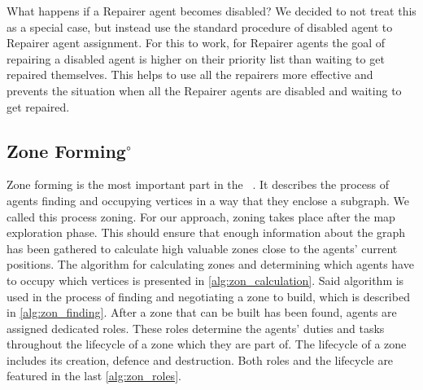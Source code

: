 What happens if a Repairer agent becomes disabled?
We decided to not treat this as a special case, but instead use the standard procedure of disabled agent to Repairer agent assignment.
For this to work, for Repairer agents the goal of repairing a disabled agent is higher on their priority list than waiting to get repaired themselves.
This helps to use all the repairers more effective and prevents the situation when all the Repairer agents are disabled and waiting to get repaired.

\subsection[Zone Forming]{Zone Forming$^\circ$}\label{alg:zoning}
Zone forming is the most important part in the \mars{}~\cite{ahlbrecht_mapc_2014}.%
It describes the process of agents finding and occupying vertices in a way that they enclose a subgraph.
We called this process zoning.
For our approach, zoning takes place after the map exploration phase.
This should ensure that enough information about the graph has been gathered to calculate high valuable zones close to the agents' current positions.
The algorithm for calculating zones and determining which agents have to occupy which vertices is presented in \autoref{alg:zon_calculation}.
Said algorithm is used in the process of finding and negotiating a zone to build, which is described in \autoref{alg:zon_finding}.
After a zone that can be built has been found, agents are assigned dedicated roles.
These roles determine the agents' duties and tasks throughout the lifecycle of a zone which they are part of.
The lifecycle of a zone includes its creation, defence and destruction.
Both roles and the lifecycle are featured in the last \autoref{alg:zon_roles}.




